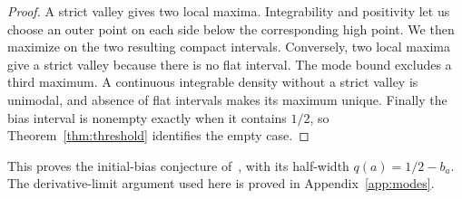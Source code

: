 \begin{proof}
A strict valley gives two local maxima. Integrability and positivity
let us choose an outer point on each side below the corresponding
high point. We then maximize on the two resulting compact
intervals. Conversely, two local
maxima give a strict valley because there is no flat interval.
The mode bound excludes a third maximum. A continuous integrable
density without a strict valley is unimodal, and absence of flat
intervals makes its maximum unique. Finally the bias interval is
nonempty exactly when it contains $1/2$, so
Theorem~\ref{thm:threshold} identifies the empty case.
\end{proof}

This proves the initial-bias conjecture
of~\cite[Remark~2.1(b)]{glrs2025}, with its half-width $q(a)=1/2-b_a$.
The derivative-limit argument used here is proved in Appendix~\ref{app:modes}.


